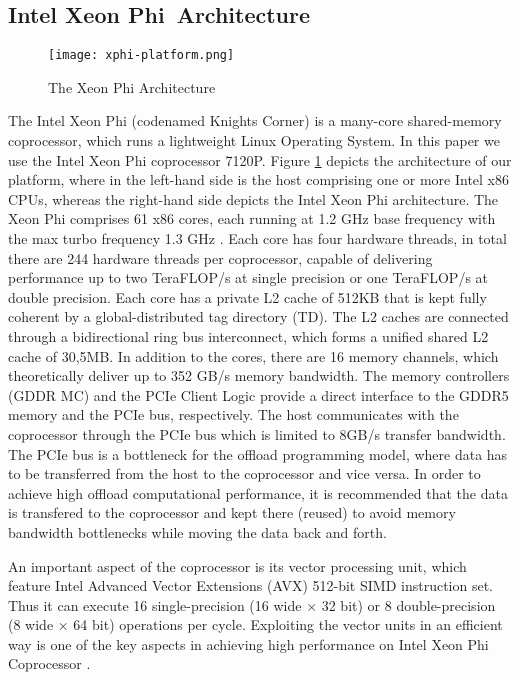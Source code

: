 \documentclass[conference]{IEEEtran}
\begin{document}
\subsection{Intel\textsuperscript{\textregistered} Xeon Phi\texttrademark ~Architecture}


\begin{figure}[!ht]
	\centering
	\texttt{[image: xphi-platform.png]}
	\caption{The Xeon Phi Architecture}
	\label{fig:xphi-platform}
	\vspace{-10pt}
\end{figure}

The Intel Xeon Phi (codenamed Knights Corner) is a many-core shared-memory coprocessor, which runs a lightweight Linux Operating System. In this paper we use the Intel Xeon Phi coprocessor 7120P. Figure \ref{fig:xphi-platform} depicts the architecture of our platform, where in the left-hand side is the host comprising one or more Intel x86 CPUs, whereas the right-hand side depicts the Intel Xeon Phi architecture. The Xeon Phi comprises 61 x86 cores, each running at 1.2 GHz base frequency with the max turbo frequency 1.3 GHz \cite{chrysos2014intel}. Each core has four hardware threads, in total there are 244 hardware threads per coprocessor, capable of delivering performance up to two TeraFLOP/s at single precision or one TeraFLOP/s at double precision. Each core has a private L2 cache of 512KB that is kept fully coherent by a global-distributed tag directory (TD). The L2 caches are connected through a bidirectional ring bus interconnect, which forms a unified shared L2 cache of 30,5MB. In addition to the cores, there are 16 memory channels, which theoretically deliver up to 352 GB/s memory bandwidth. The memory controllers (GDDR MC) and the PCIe Client Logic provide a direct interface to the GDDR5 memory and the PCIe bus, respectively. The host communicates with the coprocessor through the PCIe bus which is limited to 8GB/s transfer bandwidth. The PCIe bus is a bottleneck for the offload programming model, where data has to be transferred from the host to the coprocessor and vice versa. In order to achieve high offload computational performance, it is recommended that the data is transfered to the coprocessor and kept there (reused) to avoid memory bandwidth bottlenecks while moving the data back and forth.

An important aspect of the coprocessor is its vector processing unit, which feature Intel Advanced Vector Extensions (AVX) 512-bit SIMD instruction set. Thus it can execute 16 single-precision (16 wide $\times$ 32 bit) or 8 double-precision (8 wide $\times$ 64 bit) operations per cycle. Exploiting the vector units in an efficient way is one of the key aspects in achieving high performance on Intel Xeon Phi Coprocessor \cite{TianSPGKMCP13}. 
\end{document}
